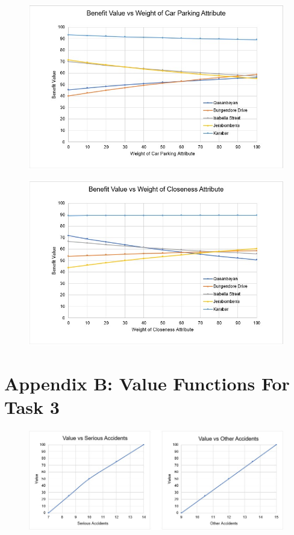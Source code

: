 \documentclass[11pt, a4paper]{article}
\begin{document}
        \begin{figure}[!ht]
            \centering
            \includegraphics[width=\textwidth]{appendices/1b.jpg}
        \end{figure}

        \begin{figure}[!ht]
            \centering
            \includegraphics[width=\textwidth]{appendices/1c.jpg}
        \end{figure}

    \newpage
    \section*{Appendix B: Value Functions For Task 3}

        \begin{figure}[!ht]
            \centering
            \includegraphics[width=\textwidth]{appendices/2a.jpg}
        \end{figure}
\end{document}

